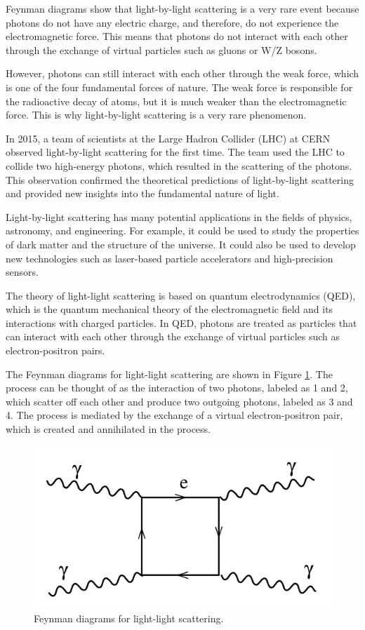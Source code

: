 \documentclass{article}
\begin{document}
Feynman diagrams show that light-by-light scattering is a very rare event because photons do not have any electric charge, and therefore, do not experience the electromagnetic force. This means that photons do not interact with each other through the exchange of virtual particles such as gluons or W/Z bosons.

However, photons can still interact with each other through the weak force, which is one of the four fundamental forces of nature. The weak force is responsible for the radioactive decay of atoms, but it is much weaker than the electromagnetic force. This is why light-by-light scattering is a very rare phenomenon.

In 2015, a team of scientists at the Large Hadron Collider (LHC) at CERN observed light-by-light scattering for the first time. The team used the LHC to collide two high-energy photons, which resulted in the scattering of the photons. This observation confirmed the theoretical predictions of light-by-light scattering and provided new insights into the fundamental nature of light.

Light-by-light scattering has many potential applications in the fields of physics, astronomy, and engineering. For example, it could be used to study the properties of dark matter and the structure of the universe. It could also be used to develop new technologies such as laser-based particle accelerators and high-precision sensors.

The theory of light-light scattering is based on quantum electrodynamics (QED), which is the quantum mechanical theory of the electromagnetic field and its interactions with charged particles. In QED, photons are treated as particles that can interact with each other through the exchange of virtual particles such as electron-positron pairs.

The Feynman diagrams for light-light scattering are shown in Figure \ref{fig:light-light-scattering-feynman}. The process can be thought of as the interaction of two photons, labeled as 1 and 2, which scatter off each other and produce two outgoing photons, labeled as 3 and 4. The process is mediated by the exchange of a virtual electron-positron pair, which is created and annihilated in the process.

\begin{figure}[h]
	\centering
	\includegraphics[width=0.5\linewidth]{figures/Feynman-diagram.png}
	\caption{Feynman diagrams for light-light scattering.}
	\label{fig:light-light-scattering-feynman}
\end{figure}
\end{document}
